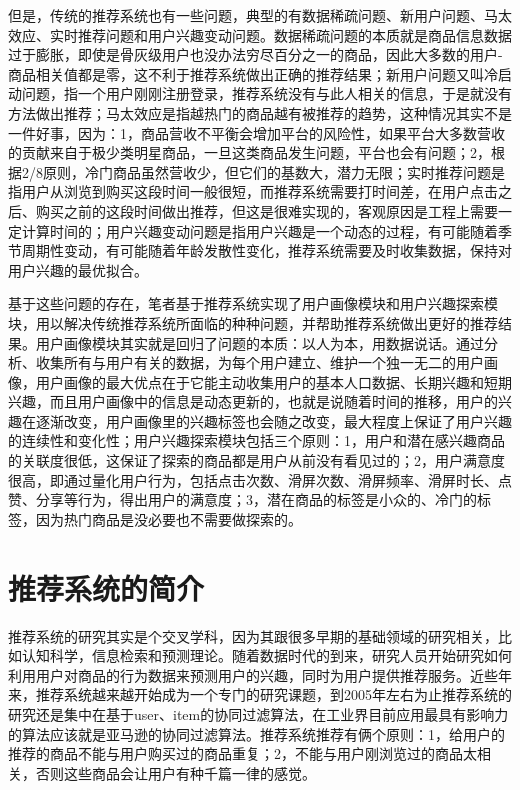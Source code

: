 	但是，传统的推荐系统也有一些问题，典型的有数据稀疏问题、新用户问题、马太效应、实时推荐问题和用户兴趣变动问题。数据稀疏问题的本质就是商品信息数据过于膨胀，即使是骨灰级用户也没办法穷尽百分之一的商品，因此大多数的用户-商品相关值都是零，这不利于推荐系统做出正确的推荐结果；新用户问题又叫冷启动问题，指一个用户刚刚注册登录，推荐系统没有与此人相关的信息，于是就没有方法做出推荐；马太效应是指越热门的商品越有被推荐的趋势，这种情况其实不是一件好事，因为：1，商品营收不平衡会增加平台的风险性，如果平台大多数营收的贡献来自于极少类明星商品，一旦这类商品发生问题，平台也会有问题；2，根据2/8原则，冷门商品虽然营收少，但它们的基数大，潜力无限；实时推荐问题是指用户从浏览到购买这段时间一般很短，而推荐系统需要打时间差，在用户点击之后、购买之前的这段时间做出推荐，但这是很难实现的，客观原因是工程上需要一定计算时间的；用户兴趣变动问题是指用户兴趣是一个动态的过程，有可能随着季节周期性变动，有可能随着年龄发散性变化，推荐系统需要及时收集数据，保持对用户兴趣的最优拟合。

	基于这些问题的存在，笔者基于推荐系统实现了用户画像模块和用户兴趣探索模块，用以解决传统推荐系统所面临的种种问题，并帮助推荐系统做出更好的推荐结果。用户画像模块其实就是回归了问题的本质：以人为本，用数据说话。通过分析、收集所有与用户有关的数据，为每个用户建立、维护一个独一无二的用户画像，用户画像的最大优点在于它能主动收集用户的基本人口数据、长期兴趣和短期兴趣，而且用户画像中的信息是动态更新的，也就是说随着时间的推移，用户的兴趣在逐渐改变，用户画像里的兴趣标签也会随之改变，最大程度上保证了用户兴趣的连续性和变化性；用户兴趣探索模块包括三个原则：1，用户和潜在感兴趣商品的关联度很低，这保证了探索的商品都是用户从前没有看见过的；2，用户满意度很高，即通过量化用户行为，包括点击次数、滑屏次数、滑屏频率、滑屏时长、点赞、分享等行为，得出用户的满意度；3，潜在商品的标签是小众的、冷门的标签，因为热门商品是没必要也不需要做探索的。

\section{推荐系统的简介}
推荐系统的研究其实是个交叉学科，因为其跟很多早期的基础领域的研究相关，比如认知科学\citep{cognitive-science}，信息检索\citep{info-retrieval}和预测理论\citep{Forecast-principle}。随着数据时代的到来，研究人员开始研究如何利用用户对商品的行为数据来预测用户的兴趣，同时为用户提供推荐服务\citep{cf-sn}。近些年来，推荐系统越来越开始成为一个专门的研究课题，到2005年左右为止推荐系统的研究还是集中在基于user、item的协同过滤算法，在工业界目前应用最具有影响力的算法应该就是亚马逊的协同过滤算法\citep{Amazon-cf}。推荐系统推荐有俩个原则：1，给用户的推荐的商品不能与用户购买过的商品重复；2，不能与用户刚浏览过的商品太相关，否则这些商品会让用户有种千篇一律的感觉。

